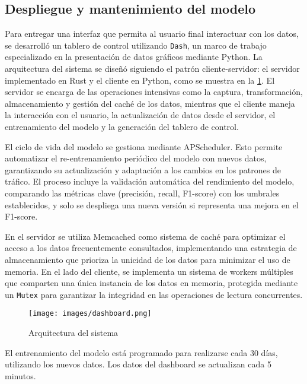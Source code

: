 \documentclass[12pt]{article}
\begin{document}

\subsection{Despliegue y mantenimiento del modelo}

Para entregar una interfaz que permita al usuario final interactuar con los datos, se desarrolló un tablero de control utilizando \texttt{Dash}, un marco de trabajo especializado en la presentación de datos gráficos mediante Python. La arquitectura del sistema se diseñó siguiendo el patrón cliente-servidor: el servidor implementado en Rust y el cliente en Python, como se muestra en la \cref{fig:architecture}. El servidor se encarga de las operaciones intensivas como la captura, transformación, almacenamiento y gestión del caché de los datos, mientras que el cliente maneja la interacción con el usuario, la actualización de datos desde el servidor, el entrenamiento del modelo y la generación del tablero de control.

El ciclo de vida del modelo se gestiona mediante APScheduler. Esto permite automatizar el re-entrenamiento periódico del modelo con nuevos datos, garantizando su actualización y adaptación a los cambios en los patrones de tráfico. El proceso incluye la validación automática del rendimiento del modelo, comparando las métricas clave (precisión, recall, F1-score) con los umbrales establecidos, y solo se despliega una nueva versión si representa una mejora en el F1-score.

En el servidor se utiliza Memcached como sistema de caché para optimizar el acceso a los datos frecuentemente consultados, implementando una estrategia de almacenamiento que prioriza la unicidad de los datos para minimizar el uso de memoria. En el lado del cliente, se implementa un sistema de workers múltiples que comparten una única instancia de los datos en memoria, protegida mediante un \texttt{Mutex} para garantizar la integridad en las operaciones de lectura concurrentes.

\begin{figure}[H]
    \centering
    \texttt{[image: images/dashboard.png]}
    \caption{Arquitectura del sistema}
    \label{fig:architecture}
\end{figure}

El entrenamiento del modelo está programado para realizarse cada 30 días, utilizando los nuevos datos. Los datos del dashboard se actualizan cada 5 minutos.
\end{document}
